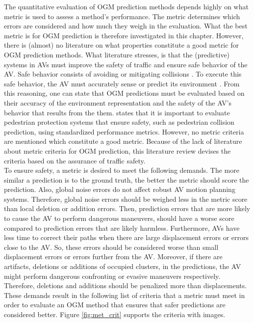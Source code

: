 The quantitative evaluation of \gls{OGM} prediction methods depends highly on what metric is used to assess a method's performance. The metric determines which errors are considered and how much they weigh in the evaluation. What the best metric is for \gls{OGM} prediction is therefore investigated in this chapter.
However, there is (almost) no literature on what properties constitute a good metric for \gls{OGM} prediction methods. What literature stresses, is that the (predictive) systems in \glspl{AV} must improve the safety of traffic and ensure safe behavior of the \gls{AV}. Safe behavior consists of avoiding or mitigating collisions \cite{kaempchen2009situation} \cite{annell2016probabilistic}. To execute this safe behavior, the \gls{AV} must accurately sense or predict its environment \cite{mitra2018towards} \cite{themann2015impact} \cite{annell2016probabilistic}. From this reasoning, one can state that \gls{OGM} predictions must be evaluated based on their accuracy of the environment representation and the safety of the \gls{AV}'s behavior that results from the them. \cite{gandhi2007pedestrian} states that it is important to evaluate pedestrian protection systems that ensure safety, such as pedestrian collision prediction, using standardized performance metrics. However, no metric criteria are mentioned which constitute a good metric. Because of the lack of literature about metric criteria for \gls{OGM} prediction, this literature review devises the criteria based on the assurance of traffic safety. \\

To ensure safety, a metric is desired to meet the following demands. The more similar a prediction is to the ground truth, the better the metric should score the prediction. Also, global noise errors do not affect robust \gls{AV} motion planning systems. Therefore, global noise errors should be weighed less in the metric score than local deletion or addition errors. Then, prediction errors that are more likely to cause the \gls{AV} to perform dangerous maneuvers, should have a worse score compared to prediction errors that are likely harmless. Furthermore, \glspl{AV} have less time to correct their paths when there are large displacement errors or errors close to the \gls{AV}. So, these errors should be considered worse than small displacement errors or errors further from the \gls{AV}. Moreover, if there are artifacts, deletions or additions of occupied clusters, in the predictions, the \gls{AV} might perform dangerous confronting or evasive maneuvers respectively. Therefore, deletions and additions should be penalized more than displacements. These demands result in the following list of criteria that a metric must meet in order to evaluate an \gls{OGM} method that ensures that safer predictions are considered better. Figure \ref{fig:met_crit} supports the criteria with images.

